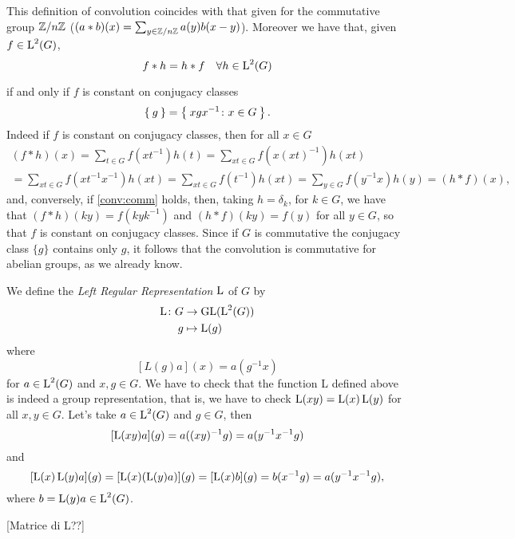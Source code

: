 \begin{rem}
This definition of convolution coincides with that given for the commutative group ${\mathbb Z}/{n{\mathbb Z}}$ ($(a\ast b)(x)=\sum_{y \in {\mathbb Z}/{n{\mathbb Z}}} a(y)b(x-y)$). 
Moreover we have that, given $f\in \operatorname{L}^2(G)$,
\begin{equation}
\label{conv:comm}
f*h=h*f \quad \forall h \in \operatorname{L}^2(G)
\end{equation}

if and only if $f$ is constant on conjugacy classes
\[
\Set{g}=\Set{xgx^{-1}\colon x\in G}.
\]
Indeed if $f$ is constant on conjugacy classes, then for all $x\in G$
\begin{multline*}
(f\ast h)(x) =\sum_{t \in G} f(xt^{-1})h(t)=\sum_{xt \in G} f(x(xt)^{-1})h(xt)\\
=\sum_{xt \in G} f(xt^{-1}x^{-1})h(xt)
=\sum_{xt \in G} f(t^{-1})h(xt)
=\sum_{y \in G} f(y^{-1}x)h(y)= (h*f)(x),
\end{multline*}
and, conversely, if \ref{conv:comm} holds, then, taking $h=\delta_k$, for $k\in G$, we have that $(f\ast h)(ky)=f(kyk^{-1})$ and $(h*f)(ky)=f(y)$ for all $y \in G$, so that $f$ is constant on conjugacy classes.
Since if $G$ is commutative the conjugacy class $\{g\}$ contains only $g$, it follows that the convolution is commutative for abelian groups, as we already know.
\end{rem}
\begin{exmp}
We define the \emph{Left Regular Representation} $\operatorname{L}$ of $G$ by 
\begin{align*}
\operatorname{L}\colon G &\rightarrow \operatorname{GL}(\operatorname{L}^2(G))\\
	 g&\mapsto \operatorname{L}(g) 
\end{align*}
where 
\[
[L(g)a](x)=a(g^{-1}x)
\]
for $a \in \operatorname{L}^2(G)$ and $x,g \in G$.
We have to check that the function L defined above is indeed a group representation, that is, we have to check $\operatorname{L}(xy)=\operatorname{L}(x)\operatorname{L}(y)$ for all $x,y \in G$. Let's take $a \in \operatorname{L}^2(G)$ and $g\in G$, then
\[ [\operatorname{L}(xy)a](g)=a((xy)^{-1}g)=a(y^{-1}x^{-1}g)
\]
and
\[
[\operatorname{L}(x)\operatorname{L}(y)a](g)=[\operatorname{L}(x)(\operatorname{L}(y)a)](g)=[\operatorname{L}(x)b](g)=b(x^{-1}g)=a(y^{-1}x^{-1}g),
\]
where $b=\operatorname{L}(y)a \in \operatorname{L}^2(G)$.

[Matrice di L??]
\end{exmp}

